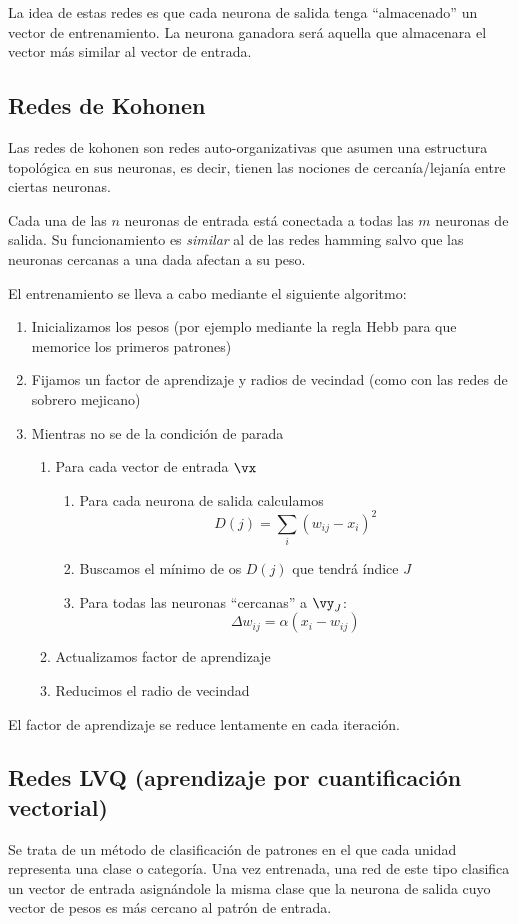 \obs La idea de estas redes es que cada neurona de salida tenga ``almacenado'' un vector de entrenamiento. La neurona ganadora será aquella que almacenara el vector más similar al vector de entrada.

\subsection{Redes de Kohonen}
Las redes de kohonen son redes auto-organizativas que asumen una estructura topológica en sus neuronas, es decir, tienen las nociones de cercanía/lejanía entre ciertas neuronas.

Cada una de las $n$ neuronas de entrada está conectada a todas las $m$ neuronas de salida. Su funcionamiento es \emph{similar} al de las redes hamming salvo que las neuronas cercanas a una dada afectan a su peso.

El entrenamiento se lleva a cabo mediante el siguiente algoritmo:
\begin{enumerate}
\item Inicializamos los pesos (por ejemplo mediante la regla Hebb para que memorice los primeros patrones)
\item Fijamos un factor de aprendizaje y radios de vecindad (como con las redes de sobrero mejicano)
\item Mientras no se de la condición de parada
\begin{enumerate}
\item Para cada vector de entrada $\vx$
\begin{enumerate}
\item Para cada neurona de salida calculamos
\[D(j)=\sum_i (w_{ij}-x_i)^2\]
\item Buscamos el mínimo de os $D(j)$ que tendrá índice $J$
\item Para todas las neuronas ``cercanas'' a $\vy_J$:
\[Δw_{ij} = α(x_i-w_{ij})\]
\end{enumerate}
\item Actualizamos factor de aprendizaje
\item Reducimos el radio de vecindad
\end{enumerate}
\end{enumerate}

\obs El factor de aprendizaje se reduce lentamente en cada iteración.

\subsection{Redes LVQ (aprendizaje por cuantificación vectorial)}
Se trata de un método de clasificación de patrones en el que cada unidad representa una clase o categoría. Una vez entrenada, una red de este tipo clasifica un vector de entrada asignándole la misma clase que la neurona de salida cuyo vector de pesos es más cercano al patrón de entrada.

